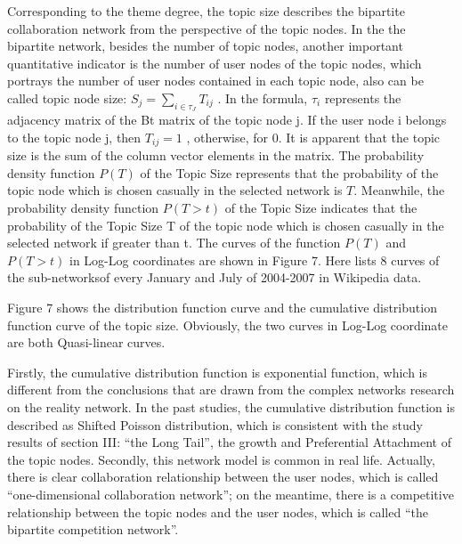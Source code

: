 \documentclass{elsarticle}
\begin{document}
Corresponding to the theme degree, the topic size describes the
bipartite collaboration network from the perspective of the topic
nodes. In the the bipartite network, besides the number of topic
nodes, another important quantitative indicator is the number of user
nodes of the topic nodes, which portrays the number of user nodes
contained in each topic node, also can be called topic node size: $S_j
= \sum_{i \in \tau_{J}}T_{ij}$ . In the formula, $\tau_i$  represents
the adjacency matrix of the Bt matrix of the topic node j. If the user
node i belongs to the topic node j, then $T_{ij}=1$ , otherwise, for
0. It is apparent that the topic size is the sum of the column vector
elements in the matrix. The probability density function $P(T)$  of
the Topic Size represents that the probability of the topic node which
is chosen casually in the selected network is $T$. Meanwhile, the
probability density function $P(T>t)$  of the Topic Size indicates
that the probability of the Topic Size T of the topic node which is
chosen casually in the selected network if greater than t. The curves
of the function $P(T)$  and  $P(T>t)$  in Log-Log coordinates are
shown in Figure 7.  Here lists 8 curves of the sub-networksof every
January and July of 2004-2007 in Wikipedia data.

Figure 7 shows the distribution function curve and the cumulative
distribution function curve of the topic size. Obviously, the two
curves in Log-Log coordinate are both Quasi-linear curves. 

Firstly, the cumulative distribution function is exponential function,
which is different from the conclusions that are drawn from the
complex networks research on the reality network. In the past studies,
the cumulative distribution function is described as Shifted Poisson
distribution, which is consistent with the study results of section
III: “the Long Tail”, the growth and Preferential Attachment of the
topic nodes. Secondly, this network model is common in real
life. Actually, there is clear collaboration relationship between the
user nodes, which is called “one-dimensional collaboration network”;
on the meantime, there is a competitive relationship between the topic
nodes and the user nodes, which is called “the bipartite competition
network”. 
\end{document}
